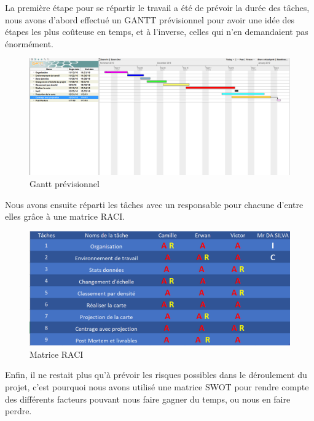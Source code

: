 \documentclass{article}
\begin{document}
\vspace{1\baselineskip}

La première étape pour se répartir le travail a été de prévoir la durée des tâches, nous avons d’abord effectué un GANTT prévisionnel pour avoir une idée des étapes les plus coûteuse en temps, et à l’inverse, celles qui n’en demandaient pas énormément.

\vspace{1\baselineskip}

\begin{figure}[H]
    \centering
    \includegraphics[scale=0.3]{gantt.png}
    \caption{Gantt prévisionnel}
    \label{fig:gantt}
\end{figure}

Nous avons ensuite réparti les tâches avec un responsable pour chacune d’entre elles grâce à une matrice RACI.

\vspace{1\baselineskip}

\begin{figure}[H]
    \centering
    \includegraphics[scale=0.4]{raci.png}
    \caption{Matrice RACI}
    \label{fig:raci}
\end{figure}

Enfin, il ne restait plus qu’à prévoir les risques possibles dans le déroulement du projet, c’est pourquoi nous avons utilisé une matrice SWOT pour rendre compte des différents facteurs pouvant nous faire gagner du temps, ou nous en faire perdre.
\end{document}
